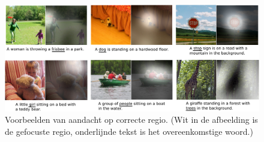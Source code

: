 \begin{figure}[tb]
	\centering
	\includegraphics[width=\linewidth]{Images/good_Xu.pdf}
	\caption{Voorbeelden van aandacht op correcte regio. (Wit in de afbeelding is de gefocuste regio, onderlijnde tekst is het overeenkomstige woord.)}
	\label{fig:attention-example}
\end{figure}










